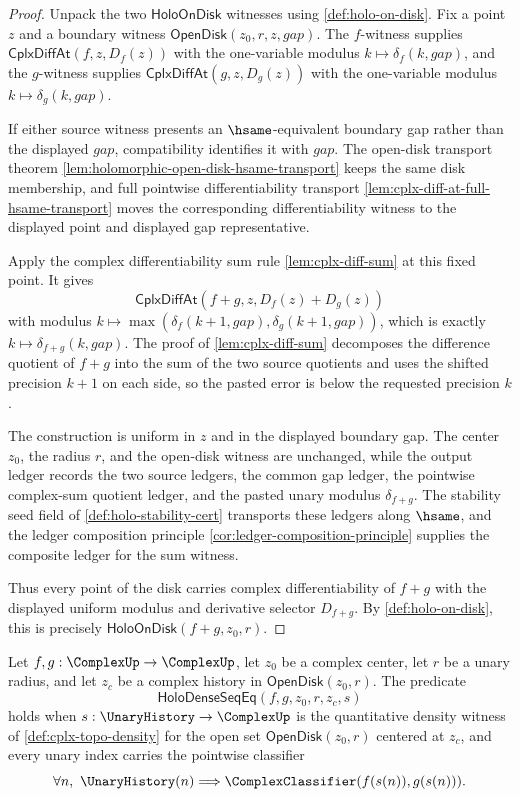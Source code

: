 \begin{proof}
Unpack the two $\mathsf{HoloOnDisk}$ witnesses using \autoref{def:holo-on-disk}. Fix a point $z$ and a boundary witness $\mathsf{OpenDisk}(z_0,r,z,gap)$. The $f$-witness supplies $\mathsf{CplxDiffAt}(f,z,D_f(z))$ with the one-variable modulus $k\mapsto\delta_f(k,gap)$, and the $g$-witness supplies $\mathsf{CplxDiffAt}(g,z,D_g(z))$ with the one-variable modulus $k\mapsto\delta_g(k,gap)$.

If either source witness presents an $\hsame$-equivalent boundary gap rather than the displayed $gap$, compatibility identifies it with $gap$. The open-disk transport theorem \autoref{lem:holomorphic-open-disk-hsame-transport} keeps the same disk membership, and full pointwise differentiability transport \autoref{lem:cplx-diff-at-full-hsame-transport} moves the corresponding differentiability witness to the displayed point and displayed gap representative.

Apply the complex differentiability sum rule \autoref{lem:cplx-diff-sum} at this fixed point. It gives
$$
\mathsf{CplxDiffAt}(f+g,z,D_f(z)+D_g(z))
$$
with modulus $k\mapsto\max(\delta_f(k+1,gap),\delta_g(k+1,gap))$, which is exactly $k\mapsto\delta_{f+g}(k,gap)$. The proof of \autoref{lem:cplx-diff-sum} decomposes the difference quotient of $f+g$ into the sum of the two source quotients and uses the shifted precision $k+1$ on each side, so the pasted error is below the requested precision $k$.

The construction is uniform in $z$ and in the displayed boundary gap. The center $z_0$, the radius $r$, and the open-disk witness are unchanged, while the output ledger records the two source ledgers, the common gap ledger, the pointwise complex-sum quotient ledger, and the pasted unary modulus $\delta_{f+g}$. The stability seed field of \autoref{def:holo-stability-cert} transports these ledgers along $\hsame$, and the ledger composition principle \autoref{cor:ledger-composition-principle} supplies the composite ledger for the sum witness.

Thus every point of the disk carries complex differentiability of $f+g$ with the displayed uniform modulus and derivative selector $D_{f+g}$. By \autoref{def:holo-on-disk}, this is precisely $\mathsf{HoloOnDisk}(f+g,z_0,r)$.
\end{proof}

\begin{definition}
\label{def:holo-dense-sequence-agreement}
Let $f,g:\ComplexUp\to\ComplexUp$, let $z_0$ be a complex center, let $r$ be a unary radius, and let $z_c$ be a complex history in $\mathsf{OpenDisk}(z_0,r)$. The predicate
$$
\mathsf{HoloDenseSeqEq}(f,g,z_0,r,z_c,s)
$$
holds when $s:\UnaryHistory\to\ComplexUp$ is the quantitative density witness of \autoref{def:cplx-topo-density} for the open set $\mathsf{OpenDisk}(z_0,r)$ centered at $z_c$, and every unary index carries the pointwise classifier
$$
\forall n,\ \UnaryHistory(n)\Longrightarrow \ComplexClassifier(f(s(n)),g(s(n))).
$$
\end{definition}

